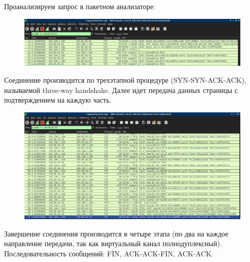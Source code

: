 \documentclass[russian,utf8,emptystyle]{eskdtext}
\begin{document}
Проанализируем запрос в пакетном анализаторе:
\begin{figure}[h!]
\centering
\includegraphics[width=\textwidth]{012}
\end{figure}

Соединение производится по трехэтапной процедуре (SYN-SYN-ACK-ACK), называемой three-way handshake. Далее идет передача данных страницы с подтверждением на каждую часть.

\begin{figure}[h!]
\centering
\includegraphics[width=\textwidth]{013}
\end{figure}

Завершение соединения производится в четыре этапа (по два на каждое направление передачи, так как виртуальный канал полнодуплексный). Последовательность сообщений: FIN, ACK-ACK-FIN, ACK-ACK.

\end{document}

